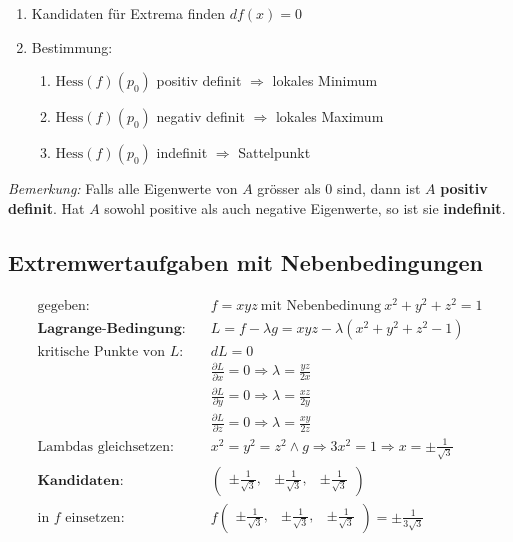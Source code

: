 \documentclass[11pt]{article}
\begin{document}
\begin{enumerate}[noitemsep]
	\item Kandidaten f{\"u}r Extrema finden $df(x)=0$
	\item Bestimmung:
	\begin{enumerate}[noitemsep]
		\item $\text{Hess}(f)(p_0)$ positiv definit $\Rightarrow$ lokales Minimum
		\item $\text{Hess}(f)(p_0)$ negativ definit $\Rightarrow$ lokales Maximum
		\item $\text{Hess}(f)(p_0)$ indefinit $\Rightarrow$ Sattelpunkt
	\end{enumerate}
\end{enumerate}

\emph{Bemerkung:} Falls alle Eigenwerte von $A$ gr{\"o}sser als $0$ sind, dann ist $A$ \textbf{positiv definit}. Hat $A$ sowohl positive als auch negative Eigenwerte, so ist sie \textbf{indefinit}.

\subsection{Extremwertaufgaben mit Nebenbedingungen}

\begin{equation*}
\begin{split}
	\text{gegeben:} \quad & f = xyz\ \text{mit Nebenbedinung}\ x^2 + y^2 + z^2 = 1 \\
	\textbf{Lagrange-Bedingung:} \quad & L = f - \lambda g = xyz - \lambda(x^2 + y^2 + z^2 - 1) \\
	\text{kritische Punkte von $L$:} \quad & dL = 0 \\
	& \frac{\partial L}{\partial x} = 0 \Rightarrow \lambda = \frac{yz}{2x} \\
	& \frac{\partial L}{\partial y} = 0 \Rightarrow \lambda = \frac{xz}{2y} \\
	& \frac{\partial L}{\partial z} = 0 \Rightarrow \lambda = \frac{xy}{2z} \\
	\text{Lambdas gleichsetzen:} \quad & x^2 = y^2 = z^2 \land g \Rightarrow 3x^2 = 1 \Rightarrow x = \pm \frac{1}{\sqrt{3}} \\
	\textbf{Kandidaten:} \quad & \begin{pmatrix}
		\pm \frac{1}{\sqrt{3}}, & \pm \frac{1}{\sqrt{3}}, & \pm \frac{1}{\sqrt{3}}
	\end{pmatrix} \\
	\text{in $f$ einsetzen:} \quad & f\begin{pmatrix}
		\pm \frac{1}{\sqrt{3}}, & \pm \frac{1}{\sqrt{3}}, & \pm \frac{1}{\sqrt{3}}
	\end{pmatrix} = \pm \frac{1}{3\sqrt{3}}
\end{split}
\end{equation*}
\end{document}
